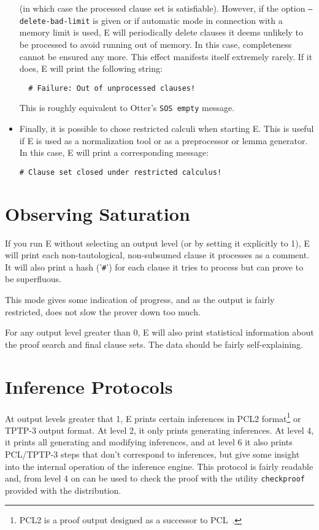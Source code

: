 \documentclass{report}
\begin{document}
\begin{itemize}
  (in which case the processed clause set is satisfiable). However, if
  the option \texttt{--delete-bad-limit} is given or if automatic mode
  in connection with a memory limit is used, E will periodically
  delete clauses it deems unlikely to be processed to avoid running
  out of memory. In this case, completeness cannot be ensured any
  more. This effect manifests itself extremely rarely. If it does, E
  will print the following string:
\begin{verbatim}
  # Failure: Out of unprocessed clauses!
\end{verbatim}
  This is roughly equivalent to Otter's \texttt{SOS empty} message.
\item Finally, it is possible to chose restricted calculi when
  starting E. This is useful if E is used as a normalization tool or
  as a preprocessor or lemma generator. In this case, E will print a
  corresponding message:
\begin{verbatim}
# Clause set closed under restricted calculus!
\end{verbatim}
\end{itemize}


\section{Observing Saturation}
\label{sec:output:normal}

If you run E without selecting an output level (or by setting it
explicitly to 1), E will print each non-tautological, non-subsumed
clause it processes as a comment. It will also print a hash
('\verb+#+') for each clause it tries to process but can prove to be
superfluous.

This mode gives some indication of progress, and as the output is
fairly restricted, does not slow the prover down too much.

For any output level greater than 0, E will also print statistical
information about the proof search and final clause sets. The data
should be fairly self-explaining.


\section{Inference Protocols}
\label{sec:output:lots}

At output levels greater that 1, E prints certain inferences in
PCL2 format\footnote{PCL2 is a proof output designed as a
  successor to PCL~\cite{DS94a,DS94b,DS96a}.} or TPTP-3 output
format.  At level 2, it only prints generating
inferences. At level 4, it prints all generating and modifying
inferences, and at level 6 it also prints PCL/TPTP-3 steps that don't
correspond to inferences, but give some insight into the internal
operation of the inference engine.  This protocol is fairly readable
and, from level 4 on can be used to check the proof with the utility
\texttt{checkproof} provided with the distribution.
\end{document}
